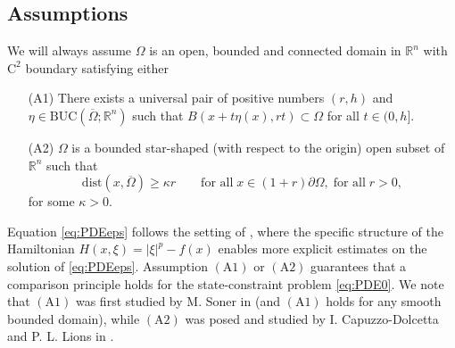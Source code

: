 \documentclass[11pt,reqno]{amsart}
\numberwithin{figure}{section}
\theoremstyle{plain}
\theoremstyle{remark}
\numberwithin{equation}{section}
\begin{document}
\subsection{Assumptions} We will always assume $\Omega$ is an open, bounded and connected domain in $\mathbb{R}^n$ with $\mathrm{C}^2$ boundary satisfying either %
\begin{itemize}    
    \item[(A1)] There exists a universal pair of positive numbers $(r,h)$ and $\eta\in \mathrm{BUC}(\overline{\Omega};\mathbb{R}^n)$ such that $B(x+t\eta(x), rt)\subset\Omega$ for all $t\in (0,h]$.
    \item[(A2)] $\Omega$ is a bounded star-shaped (with respect to the origin) open subset of $\mathbb{R}^n$ such that
    \begin{equation*}
        \mathrm{dist}(x,\overline{\Omega}) \geq \kappa r \qquad\text{for all}\; x\in (1+r) \partial\Omega, \;\text{for all}\;r>0,
    \end{equation*}
for some $\kappa > 0$.
\end{itemize}
Equation \eqref{eq:PDEeps} follows the setting of \cite{Lasry1989}, where the specific structure of the Hamiltonian $H(x,\xi) = |\xi|^p - f(x)$ enables more explicit estimates on the solution of \eqref{eq:PDEeps}. Assumption $\mathrm{(A1)}$ or $\mathrm{(A2)}$ guarantees that a comparison principle holds for the state-constraint problem \eqref{eq:PDE0}. We note that $\mathrm{(A1)}$ was first studied by M. Soner in \cite{Soner1986} (and $\mathrm{(A1)}$ holds for any smooth bounded domain), while $\mathrm{(A2)}$ was posed and studied by I. Capuzzo-Dolcetta and P. L. Lions in \cite{Capuzzo-Dolcetta1990}. 
\end{document}
